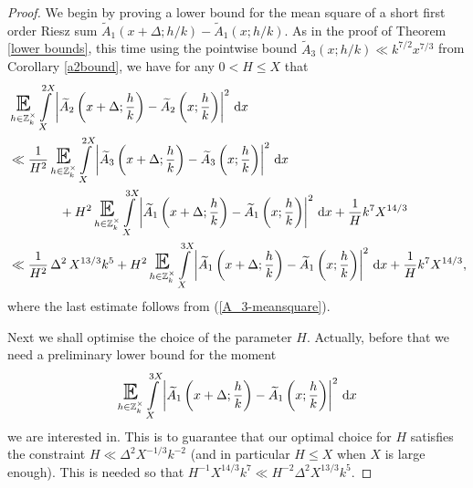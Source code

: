 \documentclass[a4paper,10pt,twoside]{amsart}
\theoremstyle{definition}
\numberwithin{equation}{section}
\newcommand\E{\mathbb{E}}
\renewcommand\:{\colon}
\begin{document}
\begin{proof}
We begin by proving a lower bound for the mean square of a short first order Riesz sum $\widetilde A_1(x+\Delta;h/k)-\widetilde A_1(x;h/k)$. As in the proof of Theorem \ref{lower bounds}, this time using the pointwise bound $\widetilde A_3(x;h/k)\ll k^{7/2}x^{7/3}$ from Corollary \ref{a2bound}, we have for any $0<H\leq X$ that
\begin{align}\label{connecting_ineq_2}
&\mathop{\text{\LARGE$\E$}}_{h\in\mathbb Z_k^\times}\int\limits_X^{2X}\left|\widetilde A_2\left(x+\Delta;\frac hk\right)-\widetilde A_2\left(x;\frac hk\right)\right|^2\,\mathrm dx \nonumber\\
&\ll \frac1{H^2}\mathop{\text{\LARGE$\E$}}_{h\in\mathbb Z_k^\times}\int\limits_X^{2X}\left|\widetilde A_3\left(x+\Delta;\frac hk\right)-\widetilde A_3\left(x;\frac hk\right)\right|^2\,\mathrm dx \nonumber\\
&\qquad\qquad+H^2\mathop{\text{\LARGE$\E$}}_{h\in\mathbb Z_k^\times}\int\limits_X^{3X}\left|\widetilde A_1\left(x+\Delta;\frac hk\right)-\widetilde A_1\left(x;\frac hk\right)\right|^2\,\mathrm dx+\frac1H k^7X^{14/3} \nonumber\\
&\ll\frac1{H^2}\,\Delta^2\,X^{13/3}k^5+H^2\mathop{\text{\LARGE$\E$}}_{h\in\mathbb Z_k^\times}\int\limits_X^{3X}\left|\widetilde A_1\left(x+\Delta;\frac hk\right)-\widetilde A_1\left(x;\frac hk\right)\right|^2\,\mathrm dx+\frac1H k^7X^{14/3},
\end{align}
where the last estimate follows from (\ref{A_3-meansquare}). 

Next we shall optimise the choice of the parameter $H$. Actually, before that we need a preliminary lower bound for the moment 
\begin{align*}
\mathop{\text{\LARGE$\E$}}_{h\in\mathbb Z_k^\times}\int\limits_X^{3X}\left|\widetilde A_1\left(x+\Delta;\frac hk\right)-\widetilde A_1\left(x;\frac hk\right)\right|^2\,\mathrm dx
\end{align*}
we are interested in. This is to guarantee that our optimal choice for $H$ satisfies the constraint $H\ll \Delta^2X^{-1/3}k^{-2}$ (and in particular $H\leq X$ when $X$ is large enough). This is needed so that $H^{-1}X^{14/3}k^7\ll H^{-2}\Delta^2X^{13/3}k^5$.


\end{proof}
\end{document}
